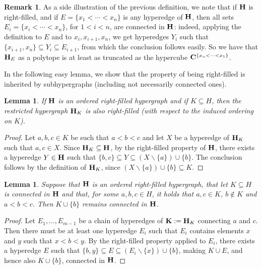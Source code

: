 \documentclass{article}
\theoremstyle{plain}
\newtheorem{lemma}[thm]{Lemma}
\theoremstyle{definition}
\newtheorem{remark}[thm]{Remark}
\newcommand{\inc}{\subseteq}
\newcommand{\set}[1]{\{#1\}}
\newcommand{\hyper}[1]{{\bf #1}}
\begin{document}
\begin{remark}
As a side illustration of the previous definition, we note that if ${\bf H}$ is right-filled, and if $E=\set{x_1<\cdots<x_n}$ is any hyperedge of ${\bf H}$, then all sets $E_i=\set{x_i<\cdots<x_n}$, for $1<i<n$, are connected in ${\bf H}$: indeed, applying the definition to $E$ and to $x_i,x_{i+1},x_n$, we get hyperedges $Y_i$ such that
$\set{x_{i+1},x_n}\inc Y_i \inc E_{i+1}$, from which the conclusion follows easily. So we have that ${\bf H}_E$ as a polytope is at least as truncated as the hypercube $\hyper{C}^{\set{x_n<\cdots<x_1}}$. 
 \end{remark}

In the following easy lemma, we show that the property of being right-filled is inherited by subhypergraphs (including not necessarily connected ones). 

\begin{lemma}\label{s000}
If ${\bf H}$ is an ordered right-filled hypergraph and if $K\subseteq H$, then the restricted hypergraph ${\bf H}_{K}$ is also right-filled (with respect to the induced ordering on $K$).
\end{lemma}
\begin{proof}
Let $a,b,c\in K$ be such that $a<b<c$ and let $X$ be a hyperedge of ${\bf H}_{K}$ such that $a,c\in X$. Since ${\bf H}_{K}\subseteq {\bf H}$, by the right-filled property of ${\bf H}$, there exists a hyperedge $Y\in{\bf H}$ such that $\{b,c\}\subseteq Y\subseteq (X\backslash\{a\})\cup\{b\}$. The conclusion follows by the definition of ${\bf H}_{K}$, since $(X\backslash\{a\})\cup\{b\}\subseteq K$.
\end{proof}

\begin{lemma}\label{s00}
Suppose that ${\bf H}$ is an ordered right-filled hypergraph, that let $K\inc H$ is connected in ${\bf H}$ and that, for some $a,b,c\in H$, it holds that $a,c\in K$, $b\not\in K$ and $a<b<c$. Then $K\cup \{b\}$ remains connected in ${\bf H}$.
\end{lemma}
\begin{proof}
 Let $E_1,\dots ,E_{m-1}$ be a chain of hyperedges of ${\bf K}:={\bf H}_K$ connecting $a$ and $c$. Then there must be at least one hyperedge $E_i$ such that $E_i$ contains elements $x$ and $y$ such that $x<b<y$. By the right-filled property applied to $E_i$, there exists a hyperedge $E$ such that $\{b,y\}\subseteq E\subseteq (E_i\backslash\{x\})\cup \{b\}$, making $K\cup E$, and hence also $K\cup\{b\}$, connected in $\hyper{H}$.
\end{proof}
\end{document}
